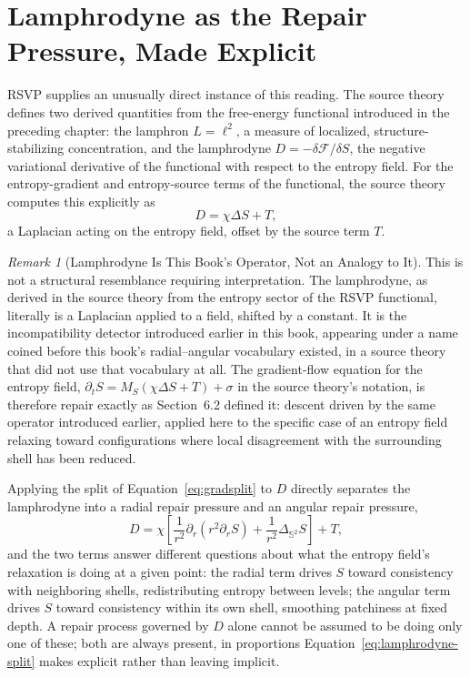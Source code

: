 \documentclass[11pt,fleqn]{book}
\numberwithin{equation}{chapter}
\theoremstyle{plain}
\theoremstyle{definition}
\theoremstyle{remark}
\newtheorem{remark}[theorem]{Remark}
\newcommand{\Sphere}{\mathbb{S}^{2}}
\begin{document}
\section{Lamphrodyne as the Repair Pressure, Made Explicit}

RSVP supplies an unusually direct instance of this reading. The source theory~\cite{holonomic} defines two derived quantities from the free-energy functional introduced in the preceding chapter: the lamphron \(L=\ell^2\), a measure of localized, structure-stabilizing concentration, and the lamphrodyne \(D=-\delta\mathcal F/\delta S\), the negative variational derivative of the functional with respect to the entropy field. For the entropy-gradient and entropy-source terms of the functional, the source theory computes this explicitly as
\begin{equation}
D = \chi\Delta S + T,
\end{equation}
a Laplacian acting on the entropy field, offset by the source term \(T\).

\begin{remark}[Lamphrodyne Is This Book's Operator, Not an Analogy to It]
This is not a structural resemblance requiring interpretation. The lamphrodyne, as derived in the source theory from the entropy sector of the RSVP functional, literally is a Laplacian applied to a field, shifted by a constant. It is the incompatibility detector introduced earlier in this book, appearing under a name coined before this book's radial--angular vocabulary existed, in a source theory that did not use that vocabulary at all. The gradient-flow equation for the entropy field, \(\partial_t S = M_S(\chi\Delta S + T)+\sigma\) in the source theory's notation, is therefore repair exactly as Section~6.2 defined it: descent driven by the same operator introduced earlier, applied here to the specific case of an entropy field relaxing toward configurations where local disagreement with the surrounding shell has been reduced.
\end{remark}

Applying the split of Equation~\eqref{eq:gradsplit} to \(D\) directly separates the lamphrodyne into a radial repair pressure and an angular repair pressure,
\begin{equation}
D = \chi\left[\frac{1}{r^2}\partial_r\!\left(r^2\partial_rS\right) + \frac{1}{r^2}\Delta_{\Sphere}S\right] + T,
\label{eq:lamphrodyne-split}
\end{equation}
and the two terms answer different questions about what the entropy field's relaxation is doing at a given point: the radial term drives \(S\) toward consistency with neighboring shells, redistributing entropy between levels; the angular term drives \(S\) toward consistency within its own shell, smoothing patchiness at fixed depth. A repair process governed by \(D\) alone cannot be assumed to be doing only one of these; both are always present, in proportions Equation~\eqref{eq:lamphrodyne-split} makes explicit rather than leaving implicit.
\end{document}
